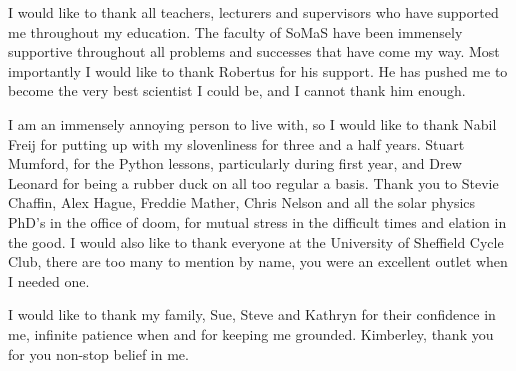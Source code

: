 
\begin{acknowledgements}      

I would like to thank all teachers, lecturers and supervisors who have supported me throughout my education.
The faculty of SoMaS have been immensely supportive throughout all problems and successes that have come my way.
Most importantly I would like to thank Robertus for his support.
He has pushed me to become the very best scientist I could be, and I cannot thank him enough.

I am an immensely annoying person to live with, so I would like to thank Nabil Freij for putting up with my slovenliness for three and a half years.
Stuart Mumford, for the Python lessons, particularly during first year, and Drew Leonard for being a rubber duck on all too regular a basis.
Thank you to Stevie Chaffin, Alex Hague, Freddie Mather, Chris Nelson and all the solar physics PhD's in the office of doom, for mutual stress in the difficult times and elation in the good. 
I would also like to thank everyone at the University of Sheffield Cycle Club, there are too many to mention by name, you were an excellent outlet when I needed one.

I would like to thank my family, Sue, Steve and Kathryn for their confidence in me, infinite patience when and for keeping me grounded.
Kimberley, thank you for you non-stop belief in me.



\end{acknowledgements}

